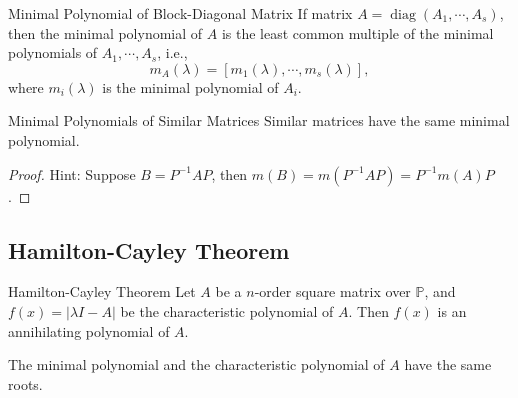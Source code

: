 \begin{proposition}{Minimal Polynomial of Block-Diagonal Matrix}{}
  If matrix $A = \operatorname{diag}(A_1,\cdots,A_s)$,
  then the minimal polynomial of $A$ is the least common multiple
  of the minimal polynomials of $A_1,\cdots,A_s$, i.e.,
  \begin{equation}
    m_A(\lambda) = [m_1(\lambda),\cdots,m_s(\lambda)],
  \end{equation}
  where $m_i(\lambda)$ is the minimal polynomial of $A_i$.
\end{proposition}

\begin{proposition}{Minimal Polynomials of Similar Matrices}{}
  Similar matrices have the same minimal polynomial.
\end{proposition}

\begin{proof}
  Hint: Suppose $B = P^{-1}AP$,
  then $m(B) = m(P^{-1}AP) = P^{-1}m(A)P$.
\end{proof}

\subsection{Hamilton-Cayley Theorem}

\begin{theorem}{Hamilton-Cayley Theorem}{}
  Let $A$ be a $n$-order square matrix over $\mathbb{P}$,
  and $f(x) = |\lambda I - A|$ be the characteristic polynomial of $A$.
  Then $f(x)$ is an annihilating polynomial of $A$.
\end{theorem}

\begin{corollary}{}{}
  The minimal polynomial and the characteristic polynomial of $A$ have the same roots.
\end{corollary}





